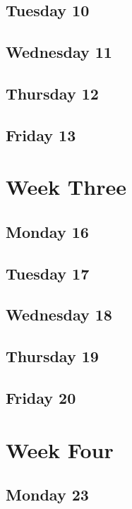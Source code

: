 \documentclass{article}
\begin{document}
\subsection{Tuesday 10}

\subsection{Wednesday 11}

\subsection{Thursday 12}

\subsection{Friday 13}

\section{Week Three}
\subsection{Monday 16}

\subsection{Tuesday 17}

\subsection{Wednesday 18}

\subsection{Thursday 19}

\subsection{Friday 20}

\section{Week Four}
\subsection{Monday 23}
\end{document}
